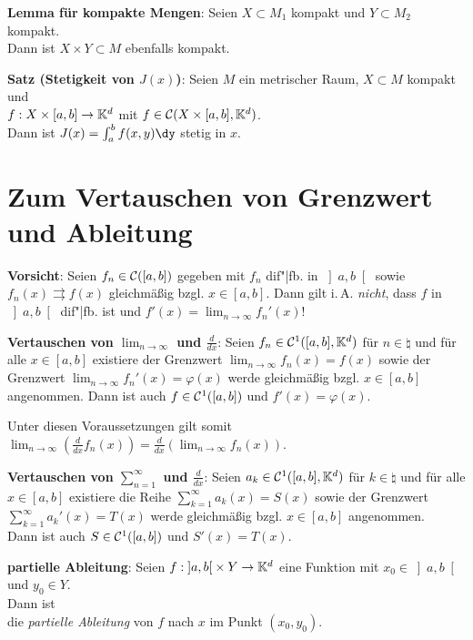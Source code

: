 \textbf{Lemma für kompakte Mengen}:
Seien $X \subset M_1$ kompakt und $Y \subset M_2$ kompakt. \\
Dann ist $X \times Y \subset M$ ebenfalls kompakt.

\linie

\textbf{Satz (Stetigkeit von $J(x)$)}:
Seien $M$ ein metrischer Raum, $X \subset M$ kompakt und \\
$f: X \times [a,b] \rightarrow \mathbb{K}^d$ mit
$f \in \mathcal{C}(X \times [a,b], \mathbb{K}^d)$. \\
Dann ist $J(x) = \int_a^b f(x, y)\dy$ stetig in $x$.

\pagebreak

\section{%
    Zum Vertauschen von Grenzwert und Ableitung%
}


\textbf{Vorsicht}:
Seien $f_n \in \mathcal{C}([a,b])$ gegeben mit $f_n$ dif"|fb. in $\left]a,b\right[$
sowie $f_n(x) \rightrightarrows f(x)$ gleichmäßig bzgl. $x \in [a,b]$.
Dann gilt i.\,A. \emph{nicht}, dass $f$ in $\left]a,b\right[$ dif"|fb. ist
und $f'(x) = \lim_{n \to \infty} f_n'(x)$!

\textbf{Vertauschen von $\lim_{n \to \infty}$ und $\frac{d}{dx}$}:
Seien $f_n \in \mathcal{C}^1([a,b], \mathbb{K}^d)$ für $n \in \natural$
und für alle $x \in [a,b]$ existiere der Grenzwert
$\lim_{n \to \infty} f_n(x) = f(x)$ sowie der Grenzwert
$\lim_{n \to \infty} f_n'(x) = \varphi(x)$ werde gleichmäßig bzgl.
$x \in [a,b]$ angenommen.
Dann ist auch $f \in \mathcal{C}^1([a,b])$ und $f'(x) = \varphi(x)$.

Unter diesen Voraussetzungen gilt somit
$\lim_{n \to \infty} \left(\frac{d}{dx} f_n(x)\right) =
\frac{d}{dx} \left(\lim_{n \to \infty} f_n(x)\right)$.

\textbf{Vertauschen von $\sum_{n=1}^\infty$ und $\frac{d}{dx}$}:
Seien $a_k \in \mathcal{C}^1([a,b], \mathbb{K}^d)$ für $k \in \natural$ und für alle \\
$x \in [a,b]$ existiere die Reihe
$\sum_{k=1}^\infty a_k(x) = S(x)$ sowie der Grenzwert
$\sum_{k=1}^\infty a_k'(x) = T(x)$ werde gleichmäßig bzgl.
$x \in [a,b]$ angenommen. \\
Dann ist auch $S \in \mathcal{C}^1([a,b])$ und $S'(x) = T(x)$.

\linie

\textbf{partielle Ableitung}:
Seien $f: \left]a,b\right[ \times Y \rightarrow \mathbb{K}^d$ eine Funktion
mit $x_0 \in \left]a,b\right[$ und $y_0 \in Y$. \\
Dann ist
 \\
die \emph{partielle Ableitung} von $f$ nach $x$ im Punkt $(x_0, y_0)$.


